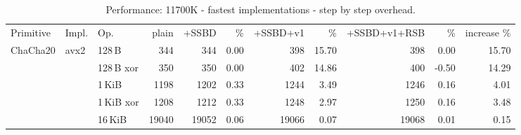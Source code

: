 
\setlength{\tabcolsep}{3pt}
\begin{table}[H]
    \caption{Performance: 11700K - fastest implementations - step by step overhead.}
    \label{tab:results:all:step:11700K:avx2}
  \begin{tabular}{lllrrrrrrrr}
  \toprule
    Primitive
 & Impl. & Op.          & plain & +SSBD & \% & +SSBD+v1 & \% & +SSBD+v1+RSB & \% & increase \% \\

    \multirow{6}{*}{ChaCha20}
 &  \multirow{6}{*}{avx2}
        & 128\,B        & 344
                        & 344
                        & 0.00
                        & 398
                        & 15.70
                        & 398
                        & 0.00
                        & 15.70 \\

 &      & 128\,B xor    & 350
                        & 350
                        & 0.00
                        & 402
                        & 14.86
                        & 400
                        & -0.50
                        & 14.29 \\

 &      & 1\,KiB        & 1198
                        & 1202
                        & 0.33
                        & 1244
                        & 3.49
                        & 1246
                        & 0.16
                        & 4.01 \\

 &      & 1\,KiB xor    & 1208
                        & 1212
                        & 0.33
                        & 1248
                        & 2.97
                        & 1250
                        & 0.16
                        & 3.48 \\

 &      & 16\,KiB       & 19040
                        & 19052
                        & 0.06
                        & 19066
                        & 0.07
                        & 19068
                        & 0.01
                        & 0.15 \\


\end{tabular}
\end{table}
